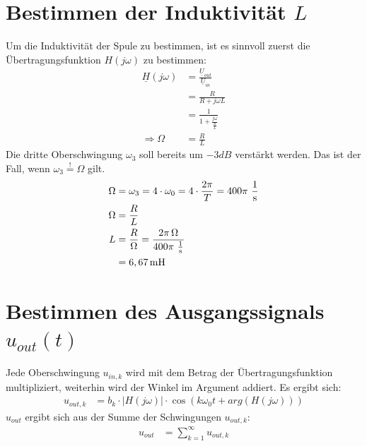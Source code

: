 \documentclass[11pt]{scrartcl}
\begin{document}
\section{Bestimmen der Induktivität $L$}
Um die Induktivität der Spule zu bestimmen, ist es sinnvoll zuerst die Übertragungsfunktion $H(j\omega)$ zu bestimmen:
\begin{align*}
  \underline{H}(j\omega) &= \frac{\underline{U}_{out}}{\underline{U}_{in}} \\
                         &= \frac{R}{R + j\omega L} \\
                         &= \frac{1}{1 + \frac{j\omega}{\frac{R}{L}}} \\
                        \Longrightarrow \Omega &= \frac{R}{L}
\end{align*}
Die dritte Oberschwingung $\omega_{3}$ soll bereits um $-3 \unit{dB}$ verstärkt werden. Das ist der Fall, wenn $\omega_{3} \overset{!}{=} \Omega$ gilt.
\begin{align*}
  \Omega &= \omega_{3} = 4\cdot\omega_{0} = 4\cdot\frac{2 \pi}{T} = 400 \pi\ \frac{1}{\text{s}} \\
  \Omega &= \frac{R}{L} \\
  L &= \frac{R}{\Omega} = \frac{2\pi \unit{$\Omega$}}{400 \pi\ \frac{1}{\text{s}}} \\
         &= 6,67 \unit{mH}
\end{align*}
\newpage
\section{Bestimmen des Ausgangssignals $u_{out}(t)$}
Jede Oberschwingung $u_{in,k}$ wird mit dem Betrag der Übertragungsfunktion multipliziert, weiterhin wird der Winkel im Argument addiert. Es ergibt sich:
\begin{align*}
  u_{out,k} &= b_{k} \cdot |H(j\omega)|\cdot \cos(k\omega_{0}t + arg(H(j\omega)))
\end{align*}
$u_{out}$ ergibt sich aus der Summe der Schwingungen $u_{out,k}$:
\begin{align*}
  u_{out} &= \sum\limits_{k=1}^{\infty} u_{out,k}
\end{align*}
\end{document}
